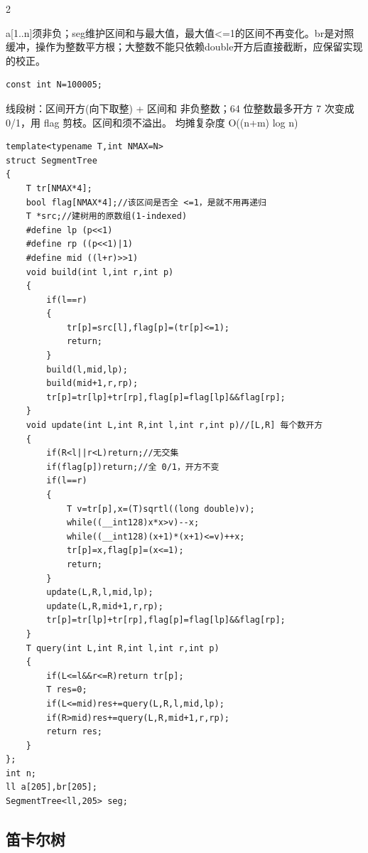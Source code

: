 \documentclass[UTF8,fontset=fandol,a4paper,twoside]{ctexart}
\newcommand{\note}[1]{{\fontsize{10}{12}\selectfont #1\par}}
\begin{document}
\begin{multicols}{2}
\note{a[\allowbreak{}1.\allowbreak{}.\allowbreak{}n]\allowbreak{}须非负；seg维护区间和与最大值，最大值<\allowbreak{}=\allowbreak{}1的区间不再变化。br是对照缓冲，操作为整数平方根；大整数不能只依赖double开方后直接截断，应保留实现的校正。}
\begin{lstlisting}
const int N=100005;
\end{lstlisting}
\note{线段树：区间开方(\allowbreak{}向下取整)\allowbreak{} +\allowbreak{} 区间和 非负整数；64 位整数最多开方 7 次变成 0/\allowbreak{}1，用 flag 剪枝。区间和须不溢出。 均摊复杂度 O(\allowbreak{}(\allowbreak{}n+\allowbreak{}m)\allowbreak{} log n)\allowbreak{}}
\begin{lstlisting}
template<typename T,int NMAX=N>
struct SegmentTree
{
    T tr[NMAX*4];
    bool flag[NMAX*4];//该区间是否全 <=1，是就不用再递归
    T *src;//建树用的原数组(1-indexed)
    #define lp (p<<1)
    #define rp ((p<<1)|1)
    #define mid ((l+r)>>1)
    void build(int l,int r,int p)
    {
        if(l==r)
        {
            tr[p]=src[l],flag[p]=(tr[p]<=1);
            return;
        }
        build(l,mid,lp);
        build(mid+1,r,rp);
        tr[p]=tr[lp]+tr[rp],flag[p]=flag[lp]&&flag[rp];
    }
    void update(int L,int R,int l,int r,int p)//[L,R] 每个数开方
    {
        if(R<l||r<L)return;//无交集
        if(flag[p])return;//全 0/1，开方不变
        if(l==r)
        {
            T v=tr[p],x=(T)sqrtl((long double)v);
            while((__int128)x*x>v)--x;
            while((__int128)(x+1)*(x+1)<=v)++x;
            tr[p]=x,flag[p]=(x<=1);
            return;
        }
        update(L,R,l,mid,lp);
        update(L,R,mid+1,r,rp);
        tr[p]=tr[lp]+tr[rp],flag[p]=flag[lp]&&flag[rp];
    }
    T query(int L,int R,int l,int r,int p)
    {
        if(L<=l&&r<=R)return tr[p];
        T res=0;
        if(L<=mid)res+=query(L,R,l,mid,lp);
        if(R>mid)res+=query(L,R,mid+1,r,rp);
        return res;
    }
};
int n;
ll a[205],br[205];
SegmentTree<ll,205> seg;
\end{lstlisting}
\subsection{笛卡尔树}


\end{multicols}
\end{document}
